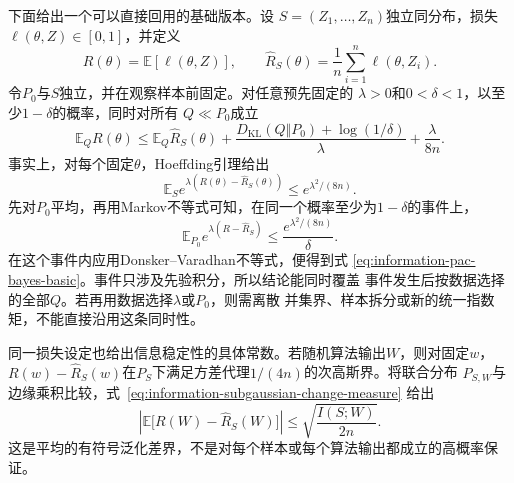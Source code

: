 下面给出一个可以直接回用的基础版本。设
\(S=(Z_1,\ldots,Z_n)\)独立同分布，损失
\(\ell(\theta,Z)\in[0,1]\)，并定义
\[
  R(\theta)=\mathbb{E}[\ell(\theta,Z)],
  \qquad
  \widehat R_S(\theta)=\frac1n\sum_{i=1}^{n}\ell(\theta,Z_i).
\]
令\(P_0\)与\(S\)独立，并在观察样本前固定。对任意预先固定的
\(\lambda>0\)和\(0<\delta<1\)，以至少\(1-\delta\)的概率，同时对所有
\(Q\ll P_0\)成立
\begin{equation}
  \mathbb{E}_{Q}R(\theta)
  \leq
  \mathbb{E}_{Q}\widehat R_S(\theta)
  +
  \frac{
    D_{\mathrm{KL}}(Q\Vert P_0)+\log(1/\delta)
  }{\lambda}
  +
  \frac{\lambda}{8n}.
  \label{eq:information-pac-bayes-basic}
\end{equation}
事实上，对每个固定\(\theta\)，Hoeffding引理给出
\[
  \mathbb{E}_S
  e^{\lambda(R(\theta)-\widehat R_S(\theta))}
  \leq e^{\lambda^2/(8n)}.
\]
先对\(P_0\)平均，再用Markov不等式可知，在同一个概率至少为\(1-\delta\)的事件上，
\[
  \mathbb{E}_{P_0}
  e^{\lambda(R-\widehat R_S)}
  \leq
  \frac{e^{\lambda^2/(8n)}}{\delta}.
\]
在这个事件内应用Donsker--Varadhan不等式，便得到式
\eqref{eq:information-pac-bayes-basic}。事件只涉及先验积分，所以结论能同时覆盖
事件发生后按数据选择的全部\(Q\)。若再用数据选择\(\lambda\)或\(P_0\)，则需离散
并集界、样本拆分或新的统一指数矩，不能直接沿用这条同时性。

同一损失设定也给出信息稳定性的具体常数。若随机算法输出\(W\)，则对固定\(w\)，
\(R(w)-\widehat R_S(w)\)在\(P_S\)下满足方差代理\(1/(4n)\)的次高斯界。将联合分布
\(P_{S,W}\)与边缘乘积比较，式~\eqref{eq:information-subgaussian-change-measure}
给出
\[
  \left|
    \mathbb{E}\bigl[R(W)-\widehat R_S(W)\bigr]
  \right|
  \leq
  \sqrt{\frac{I(S;W)}{2n}}.
\]
这是平均的有符号泛化差界，不是对每个样本或每个算法输出都成立的高概率保证。
